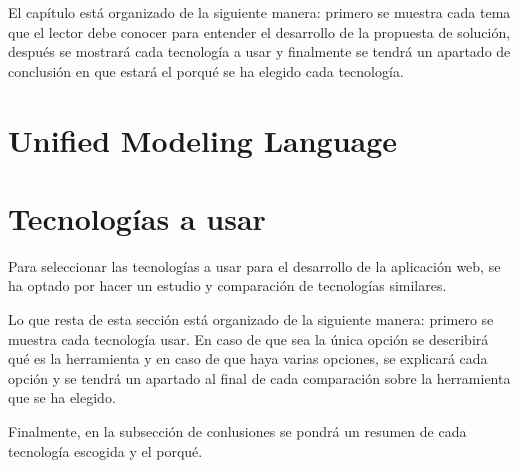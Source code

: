 El capítulo está organizado de la siguiente manera: primero se muestra cada tema que el lector debe conocer para entender el desarrollo de la propuesta de solución, después se mostrará cada tecnología a usar y finalmente se tendrá un apartado de conclusión en que estará el porqué se ha elegido cada tecnología.




 
 

 
%





\section{Unified Modeling Language}
 
\section{Tecnologías a usar}
Para seleccionar las tecnologías a usar para el desarrollo de la aplicación web, se ha optado por hacer un estudio y comparación de tecnologías similares.


Lo que resta de esta sección está organizado de la siguiente manera: primero se muestra cada tecnología usar. En caso de que sea la única opción se describirá qué es la herramienta y en caso de que haya varias opciones, se explicará cada opción y se tendrá un apartado al final de cada comparación sobre la herramienta que se ha elegido.


Finalmente, en la subsección de conlusiones se pondrá un resumen de cada tecnología escogida y el porqué.










